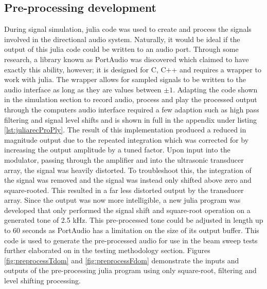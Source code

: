 \subsection{Pre-processing development}
During signal simulation, julia code was used to create and process the signals involved in the directional audio system. Naturally, it would be ideal if the output of this julia code could be written to an audio port. Through some research, a library known as PortAudio was discovered which claimed to have exactly this ability, however; it is designed for C, C++ and requires a wrapper to work with julia. The wrapper \cite{russell_2016} allows for sampled signals to be written to the audio interface as long as they are values between $\pm1$. Adapting the code shown in the simulation section to record audio, process and play the processed output through the computers audio interface required a few adaption such as high pass filtering and signal level shifts and is shown in full in the appendix under listing \ref{lst:juliarecProPly}.
The result of this implementation produced a reduced in magnitude output due to the repeated integration which was corrected for by increasing the output amplitude by a tuned factor. Upon input into the modulator, passing through the amplifier and into the ultrasonic transducer array, the signal was heavily distorted. To troubleshoot this, the integration of the signal was removed and the signal was instead only shifted above zero and square-rooted. This resulted in a far less distorted output by the transducer array.
Since the output was now more intelligible, a new julia program was developed that only performed the signal shift and square-root operation on a generated tone of 2.5 kHz. This pre-processed tone could be adjusted in length up to 60 seconds as PortAudio has a limitation on the size of its output buffer. This code is used to generate the pre-processed audio for use in the beam sweep tests further elaborated on in the testing methodology section.
Figures \ref{fig:preprocessTdom} and \ref{fig:preprocessFdom} demonstrate the inputs and outputs of the pre-processing julia program using only square-root, filtering and level shifting processing.

